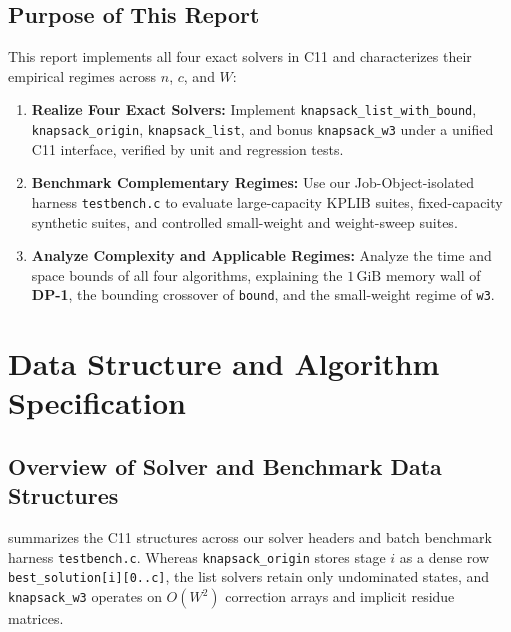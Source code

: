 \documentclass[10pt, a4paper]{article}
\newcommand{\code}[1]{\texttt{\color{primary!90!black}#1}}
\begin{document}
\subsection{Purpose of This Report}
This report implements all four exact solvers in C11 and characterizes their empirical regimes across $n$, $c$, and $W$:
\begin{enumerate}[label=\textbf{\color{primary}\arabic*.}]
  \item \textbf{Realize Four Exact Solvers:} Implement \code{knapsack\_list\_with\_bound}, \code{knapsack\_origin}, \code{knapsack\_list}, and bonus \code{knapsack\_w3} under a unified C11 interface, verified by unit and regression tests.
  \item \textbf{Benchmark Complementary Regimes:} Use our Job-Object-isolated harness \code{testbench.c} to evaluate large-capacity KPLIB suites, fixed-capacity synthetic suites, and controlled small-weight and weight-sweep suites.
  \item \textbf{Analyze Complexity and Applicable Regimes:} Analyze the time and space bounds of all four algorithms, explaining the $1\,\text{GiB}$ memory wall of \textbf{DP-1}, the bounding crossover of \code{bound}, and the small-weight regime of \code{w3}.
\end{enumerate}

\clearpage

\section{Data Structure and Algorithm Specification}

\subsection{Overview of Solver and Benchmark Data Structures}
 summarizes the C11 structures across our solver headers and batch benchmark harness \code{testbench.c}. Whereas \code{knapsack\_origin} stores stage $i$ as a dense row \code{best\_solution[i][0..c]}, the list solvers retain only undominated states, and \code{knapsack\_w3} operates on $O(W^2)$ correction arrays and implicit residue matrices.
\end{document}
